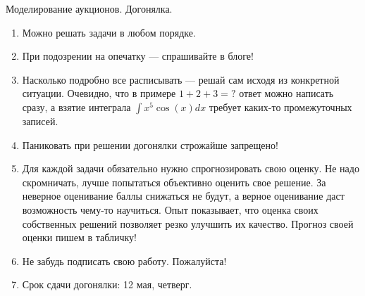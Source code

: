 \documentclass[pdftex,12pt,a4paper]{article}
\begin{document}


\begin{Large}
Моделирование аукционов. Догонялка.
\end{Large}

\begin{enumerate}
\item Можно решать задачи в любом порядке.
\item При подозрении на опечатку --- спрашивайте в блоге!
\item Насколько подробно все расписывать --- решай сам исходя из конкретной ситуации. Очевидно, что в примере $ 1+2+3=? $ ответ можно написать сразу, а взятие интеграла $ \int x^{5}\cos(x)dx $ требует каких-то промежуточных записей.
\item Паниковать при решении догонялки строжайше запрещено!
\item Для каждой задачи обязательно нужно спрогнозировать свою оценку. Не надо скромничать, лучше попытаться объективно оценить свое решение.  За неверное оценивание баллы снижаться не будут, а верное оценивание даст возможность чему-то научиться. Опыт показывает, что оценка своих собственных решений позволяет резко улучшить их качество. Прогноз своей оценки пишем в табличку!
\item Не забудь подписать свою работу. Пожалуйста!
\item Срок сдачи догонялки: 12 мая, четверг.

\end{enumerate}
\end{document}
